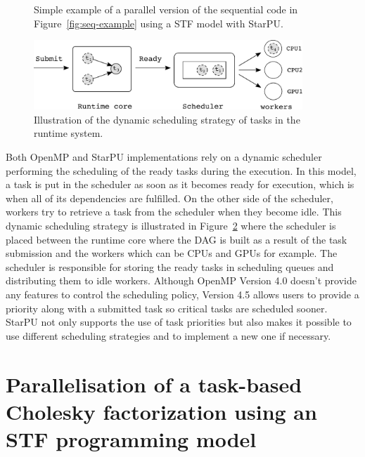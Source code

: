 \documentclass{article}
\newcommand{\starpu}{{StarPU}\xspace}
\newcommand{\openmp}{OpenMP\xspace}
\newcommand{\lsection}[1]{\section{#1} \setcounter{equation}{0} \setcounter{figure}{0} \setcounter{table}{0} \label{#1}}
\begin{document}
\begin{figure}[!h]
  \centering 
  \caption{\label{fig:stf-starpu-example}Simple example of a parallel version
    of the sequential code in Figure~\ref{fig:seq-example} using a STF
    model with \starpu.}
\end{figure}

\begin{figure}[!h]
    \centering
    \includegraphics[width=0.9\textwidth]{figures/scheduler}
    \caption{\label{fig:scheduler} Illustration of the dynamic
      scheduling strategy of tasks in the runtime system.}
\end{figure}

Both \openmp and \starpu implementations rely on a dynamic scheduler
performing the scheduling of the ready tasks during the execution. In
this model, a task is put in the scheduler as soon as it becomes ready
for execution, which is when all of its dependencies are
fulfilled. On the other side of the scheduler, workers try to retrieve
a task from the scheduler when they become idle. This dynamic
scheduling strategy is illustrated in Figure~\ref{fig:scheduler} where
the scheduler is placed between the runtime core where the DAG is
built as a result of the task submission and the workers which can be
CPUs and GPUs for example. The scheduler is responsible for storing
the ready tasks in scheduling queues and distributing them to idle
workers. Although \openmp Version 4.0 doesn't provide any features to
control the scheduling policy, Version 4.5 allows users to provide
a priority along with a submitted task so critical tasks are scheduled sooner.
\starpu not
only supports the use of task priorities but also makes it possible
to use different scheduling strategies and to implement a new one if
necessary.

\lsection{Parallelisation of a task-based Cholesky factorization using
  an STF programming model}
\label{sec:spllt-stf}

\end{document}

